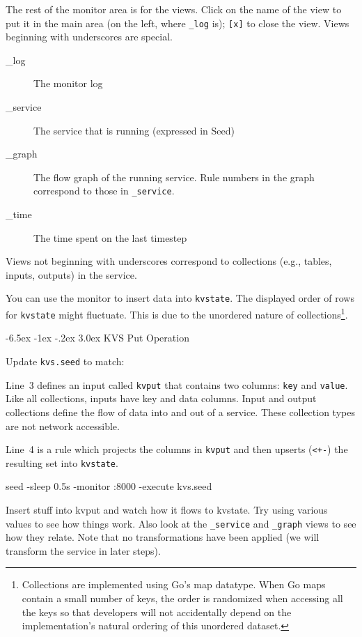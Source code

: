 \documentclass[a5paper,12pt,onecolumn]{article}
\makeatletter
\def\code#1{\mbox{\lstinline{#1}}}
\renewcommand\section{\@startsection {section}{1}{\z@}%
	{-6.5ex \@plus -1ex \@minus -.2ex}%
	{3.0ex}%
	{\sf\Large}}
\makeatother
\begin{document}
The rest of the monitor area is for the views. Click on the name of the view to put it in the main area (on the left, where \code{_log} is); \code{[x]} to close the view. Views beginning with underscores are special.

\begin{description}
\item[\_log] The monitor log
\item[\_service] The service that is running (expressed in Seed)
\item[\_graph] The flow graph of the running service. Rule numbers in the graph correspond to those in \code{_service}.
\item[\_time] The time spent on the last timestep
\end{description}

Views not beginning with underscores correspond to collections (e.g., tables, inputs, outputs) in the service.

You can use the monitor to insert data into \code{kvstate}. The displayed order of rows for \code{kvstate} might fluctuate. This is due to the unordered nature of collections\footnote{Collections are implemented using Go's map datatype. When Go maps contain a small number of keys, the order is randomized when accessing all the keys so that developers will not accidentally depend on the implementation's natural ordering of this unordered dataset.}.

\section{KVS Put Operation}

Update \code{kvs.seed} to match:



Line~3 defines an input called \code{kvput} that contains two columns: \code{key} and \code{value}. Like all collections, inputs have key and data columns. Input and output collections define the flow of data into and out of a service. These collection types are not network accessible.

Line~4 is a rule which projects the columns in \code{kvput} and then upserts (\code{<+-}) the resulting set into \code{kvstate}.

\begin{cli}
seed -sleep 0.5s -monitor :8000 -execute kvs.seed
\end{cli}

Insert stuff into kvput and watch how it flows to kvstate. Try using various values to see how things work. Also look at the \code{_service} and \code{_graph} views to see how they relate. Note that no transformations have been applied (we will transform the service in later steps).
\end{document}
